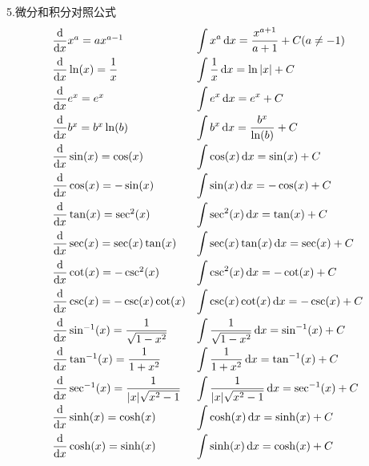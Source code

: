 \documentclass[UTF8, fontset=ubuntu]{ctexart}
\theoremstyle{empty}
\newcommand*{\dif}{\mathop{}\!\mathrm{d}}
\begin{document}
5.微分和积分对照公式\\
\begin{displaymath}
\begin{array}{l l}
\dfrac{\dif}{\dif x}x^a=ax^{a-1} & \displaystyle\int x^a\dif x=\dfrac{x^{a+1}}{a+1}+C(a\neq -1)\\[2ex]
\dfrac{\dif}{\dif x}\ln(x)=\dfrac{1}{x} & \displaystyle\int\dfrac{1}{x}\dif x=\ln|x|+C\\[2ex]
\dfrac{\dif}{\dif x}e^x=e^x & \displaystyle\int e^x\dif x=e^x+C\\[2ex]
\dfrac{\dif}{\dif x}b^x=b^x\ln(b) & \displaystyle\int b^x\dif x=\dfrac{b^x}{\ln(b)}+C\\[2ex]
\dfrac{\dif}{\dif x}\sin(x)=\cos(x) & \displaystyle\int \cos(x)\dif x=\sin(x)+C\\[2ex]
\dfrac{\dif}{\dif x}\cos(x)=-\sin(x) & \displaystyle\int \sin(x)\dif x=-\cos(x)+C\\[2ex]
\dfrac{\dif}{\dif x}\tan(x)=\sec^2(x) & \displaystyle\int \sec^2(x)\dif x=\tan(x)+C\\[2ex]
\dfrac{\dif}{\dif x}\sec(x)=\sec(x)\tan(x) & \displaystyle\int \sec(x)\tan(x)\dif x=\sec(x)+C\\[2ex]
\dfrac{\dif}{\dif x}\cot(x)=-\csc^2(x) & \displaystyle\int \csc^2(x)\dif x=-\cot(x)+C\\[2ex]
\dfrac{\dif}{\dif x}\csc(x)=-\csc(x)\cot(x) & \displaystyle\int \csc(x)\cot(x)\dif x=-\csc(x)+C\\[2ex]
\dfrac{\dif}{\dif x}\sin^{-1}(x)=\dfrac{1}{\sqrt{1-x^2}} & \displaystyle\int \dfrac{1}{\sqrt{1-x^2}}\dif x=\sin^{-1}(x)+C\\[2ex]
\dfrac{\dif}{\dif x}\tan^{-1}(x)=\dfrac{1}{1+x^2} & \displaystyle\int \dfrac{1}{1+x^2}\dif x=\tan^{-1}(x)+C\\[2ex]
\dfrac{\dif}{\dif x}\sec^{-1}(x)=\dfrac{1}{|x|\sqrt{x^2-1}} & \displaystyle\int \dfrac{1}{|x|\sqrt{x^2-1}}\dif x=\sec^{-1}(x)+C\\[2ex]
\dfrac{\dif}{\dif x}\sinh(x)=\cosh(x) & \displaystyle\int \cosh(x)\dif x=\sinh(x)+C\\[2ex]
\dfrac{\dif}{\dif x}\cosh(x)=\sinh(x) & \displaystyle\int \sinh(x)\dif x=\cosh(x)+C
\end{array}
\end{displaymath}
\end{document}
